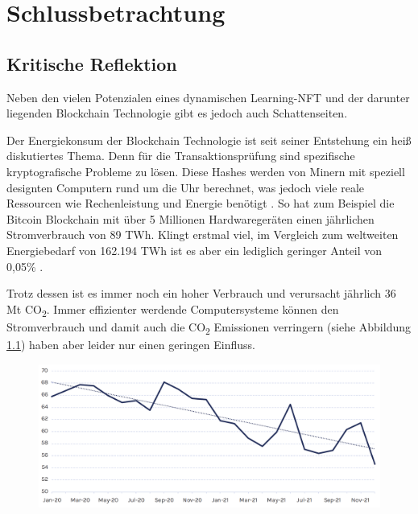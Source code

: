 \chapter{Schlussbetrachtung}

\section{Kritische Reflektion}

Neben den vielen Potenzialen eines dynamischen Learning-NFT und der darunter liegenden Blockchain Technologie gibt es jedoch auch Schattenseiten.

Der Energiekonsum der Blockchain Technologie ist seit seiner Entstehung ein heiß diskutiertes Thema.
Denn für die Transaktionsprüfung sind spezifische kryptografische Probleme zu lösen.
Diese Hashes werden von \dq Minern\dq{} mit speziell designten Computern rund um die Uhr berechnet, was jedoch viele reale Ressourcen wie Rechenleistung und Energie benötigt \parencite[vgl.][]{Cvj.ch.01.04.2022}.
So hat zum Beispiel die Bitcoin Blockchain mit über 5 Millionen Hardwaregeräten einen jährlichen Stromverbrauch von 89 \ac{TWh}.
Klingt erstmal viel, im Vergleich zum weltweiten Energiebedarf von 162.194 \ac{TWh} ist es aber ein lediglich geringer Anteil von 0,05\% \parencite[vgl.][11]{CoinShares.2022}.

Trotz dessen ist es immer noch ein hoher Verbrauch und verursacht jährlich 36 \ac{Mt} CO\textsubscript{2}.
Immer effizienter werdende Computersysteme können den Stromverbrauch und damit auch die CO\textsubscript{2} Emissionen verringern
(siehe Abbildung \ref*{fig:btceff}) haben aber leider nur einen geringen Einfluss.

    \begin{figure}
        \includegraphics[width=15.8cm]{Bilder/BitcoinEffizienz.PNG}
        \centering
        \label{fig:btceff}
    \end{figure}

